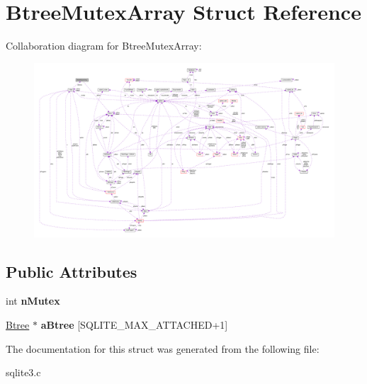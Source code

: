 \hypertarget{struct_btree_mutex_array}{\section{Btree\-Mutex\-Array Struct Reference}
\label{struct_btree_mutex_array}
}


Collaboration diagram for Btree\-Mutex\-Array\-:\nopagebreak
\begin{figure}[H]
\begin{center}
\leavevmode
\includegraphics[width=350pt]{struct_btree_mutex_array__coll__graph}
\end{center}
\end{figure}
\subsection*{Public Attributes}
\begin{DoxyCompactItemize}
\item 
\hypertarget{struct_btree_mutex_array_a1c1e4c51a9ed52ea59152831bf7fc442}{int {\bfseries n\-Mutex}}\label{struct_btree_mutex_array_a1c1e4c51a9ed52ea59152831bf7fc442}

\item 
\hypertarget{struct_btree_mutex_array_ac5bbf3594cd584c88df9cb25731e26dc}{\hyperlink{struct_btree}{Btree} $\ast$ {\bfseries a\-Btree} \mbox{[}S\-Q\-L\-I\-T\-E\-\_\-\-M\-A\-X\-\_\-\-A\-T\-T\-A\-C\-H\-E\-D+1\mbox{]}}\label{struct_btree_mutex_array_ac5bbf3594cd584c88df9cb25731e26dc}

\end{DoxyCompactItemize}


The documentation for this struct was generated from the following file\-:\begin{DoxyCompactItemize}
\item 
sqlite3.\-c\end{DoxyCompactItemize}
